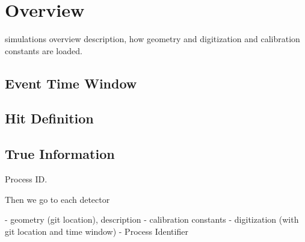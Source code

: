 \section{Overview}





simulations overview description, how geometry and digitization and calibration constants are loaded.

\subsection{Event Time Window}
\subsection{Hit Definition}
\subsection{True Information}
Process ID.


Then we go to each detector

- geometry (git location), description
- calibration constants
- digitization (with git location and time window)
- Process Identifier






